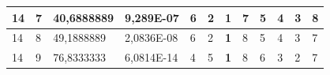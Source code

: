 \documentclass[conference]{IEEEtran}
\begin{document}
\begin{table}[]
\begin{tabular}{|llll|llllllll|}
\multicolumn{1}{|l|}{14}                                                    & \multicolumn{1}{l|}{7}                                                        & \multicolumn{1}{l|}{40,6888889}                                                   & 9,289E-07                      & \multicolumn{1}{l|}{6}                                                  & \multicolumn{1}{l|}{2}                                                  & \multicolumn{1}{l|}{\textbf{1}}                                         & \multicolumn{1}{l|}{7}                                                  & \multicolumn{1}{l|}{5}                                                  & \multicolumn{1}{l|}{4}                                                  & \multicolumn{1}{l|}{3}                                                  & 8                          \\ \hline
\multicolumn{1}{|l|}{14}                                                    & \multicolumn{1}{l|}{8}                                                        & \multicolumn{1}{l|}{49,1888889}                                                   & 2,0836E-08                     & \multicolumn{1}{l|}{6}                                                  & \multicolumn{1}{l|}{2}                                                  & \multicolumn{1}{l|}{\textbf{1}}                                         & \multicolumn{1}{l|}{8}                                                  & \multicolumn{1}{l|}{5}                                                  & \multicolumn{1}{l|}{4}                                                  & \multicolumn{1}{l|}{3}                                                  & 7                          \\ \hline
\multicolumn{1}{|l|}{14}                                                    & \multicolumn{1}{l|}{9}                                                        & \multicolumn{1}{l|}{76,8333333}                                                   & 6,0814E-14                     & \multicolumn{1}{l|}{4}                                                  & \multicolumn{1}{l|}{5}                                                  & \multicolumn{1}{l|}{\textbf{1}}                                         & \multicolumn{1}{l|}{8}                                                  & \multicolumn{1}{l|}{6}                                                  & \multicolumn{1}{l|}{3}                                                  & \multicolumn{1}{l|}{2}                                                  & 7                          \\ \hline

\end{tabular}
\end{table}
\end{document}
